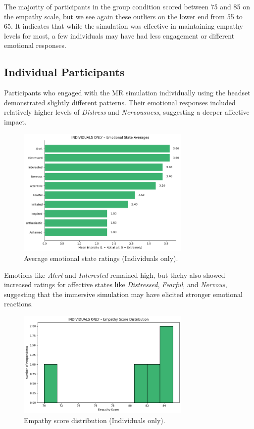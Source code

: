 The majority of participants in the group condition scored between 75 and 85 on the empathy scale, but we see again these outliers on the lower end from 55 to 65. It indicates that while the simulation was effective in maintaining empathy levels for most, a few individuals may have had less engagement or different emotional responses. 

\subsection{Individual Participants}

Participants who engaged with the MR simulation individually using the headset demonstrated slightly different patterns. Their emotional responses included relatively higher levels of \textit{Distress} and \textit{Nervousness}, suggesting a deeper affective impact.

\begin{figure}[H]
    \centering
    \includegraphics[width=0.75\textwidth]{../../Figures/emotional-post-indiv.png}
    \caption{Average emotional state ratings (Individuals only).}
    \label{fig:emotional_post_indiv}
\end{figure}

Emotions like \textit{Alert} and \textit{Interested} remained high, but thehy also showed increased ratings for affective states like \textit{Distressed}, \textit{Fearful}, and \textit{Nervous}, suggesting that the immersive simulation may have elicited stronger emotional reactions.

\begin{figure}[H]
    \centering
    \includegraphics[width=0.75\textwidth]{../../Figures/empathy-score-post-indiv.png}
    \caption{Empathy score distribution (Individuals only).}
    \label{fig:empathy_indiv_post}
\end{figure}

